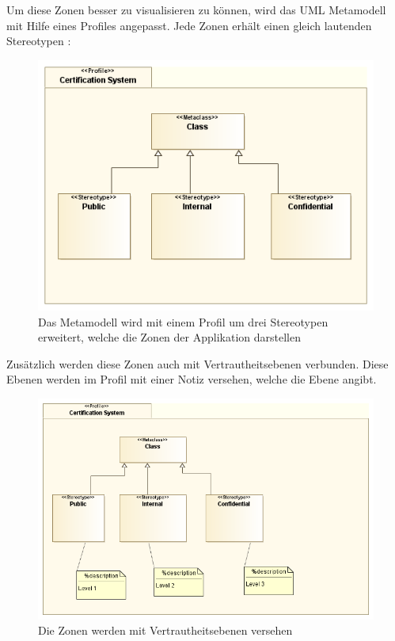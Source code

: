 Um diese Zonen besser zu visualisieren zu können, wird das UML Metamodell mit Hilfe eines Profiles angepasst. Jede Zonen erhält einen gleich lautenden Stereotypen \cite[S. 518]{glasklar}:

\begin{figure}[H]
    \centering
    \includegraphics[scale=0.5]{uml/datastereotypes.png}
    \caption{Das Metamodell wird mit einem Profil um drei Stereotypen erweitert, welche die Zonen der Applikation darstellen}
\end{figure}

Zusätzlich werden diese Zonen auch mit Vertrautheitsebenen verbunden. Diese Ebenen werden im Profil mit einer Notiz versehen, welche die Ebene angibt.

\begin{figure}[H]
    \centering
    \includegraphics[scale=0.5]{uml/datastereotypeslevel.png}
    \caption{Die Zonen werden mit Vertrautheitsebenen versehen}
\end{figure}

